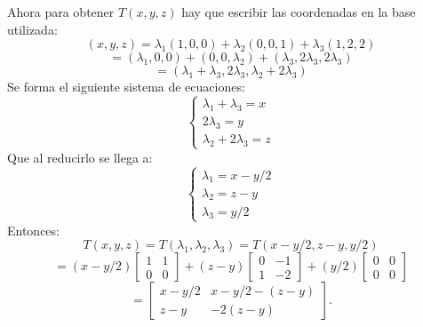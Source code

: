 \documentclass[a4paper,12pt]{article}
\begin{document}
Ahora para obtener $T(x,y,z)$ hay que escribir las coordenadas en la base utilizada:
$$
(x,y,z)=\lambda_1 (1,0,0) +\lambda_2 (0,0,1) + \lambda_3 (1,2,2)
$$
$$
= (\lambda_1, 0,0) + (0,0,\lambda_2) + (\lambda_3, 2\lambda_3, 2\lambda_3)
$$
$$
= (\lambda_1+\lambda_3, 2\lambda_3, \lambda_2+2\lambda_3)
$$
Se forma el siguiente sistema de ecuaciones:
$$
\begin{cases}
    \lambda_1+\lambda_3=x \\
    2\lambda_3=y \\
    \lambda_2+2\lambda_3=z
\end{cases}
$$
Que al reducirlo se llega a:
$$
\begin{cases}
    \lambda_1=x-y/2 \\
    \lambda_2=z-y \\
    \lambda_3=y/2
\end{cases}
$$
Entonces:
$$
T(x,y,z)=T(\lambda_1,\lambda_2,\lambda_3)=T(x-y/2,z-y,y/2)
$$
$$
= (x-y/2)\begin{bmatrix} 1 & 1 \\ 0 & 0 \end{bmatrix} + (z-y)\begin{bmatrix} 0 & -1 \\ 1 & -2 \end{bmatrix} + (y/2)\begin{bmatrix} 0 & 0 \\ 0 & 0 \end{bmatrix}
$$
$$
= \begin{bmatrix} x-y/2 & x-y/2-(z-y) \\ z-y & -2(z-y)  \end{bmatrix}.
$$
\end{document}
